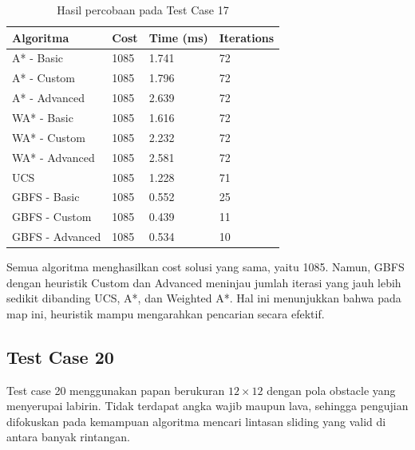 \begin{table}[H]
	\centering
	\caption{Hasil percobaan pada Test Case 17}
	\small
	\begin{tabular}{|p{4cm}|p{2.5cm}|p{2.5cm}|p{2.5cm}|}
		\hline
		\rowcolor{gray!20}
		\textbf{Algoritma} & \textbf{Cost} & \textbf{Time (ms)} & \textbf{Iterations} \\
		\hline
		A* - Basic & 1085 & 1.741 & 72 \\
		\hline
		A* - Custom & 1085 & 1.796 & 72 \\
		\hline
		A* - Advanced & 1085 & 2.639 & 72 \\
		\hline
		WA* - Basic & 1085 & 1.616 & 72 \\
		\hline
		WA* - Custom & 1085 & 2.232 & 72 \\
		\hline
		WA* - Advanced & 1085 & 2.581 & 72 \\
		\hline
		UCS & 1085 & 1.228 & 71 \\
		\hline
		GBFS - Basic & 1085 & 0.552 & 25 \\
		\hline
		GBFS - Custom & 1085 & 0.439 & 11 \\
		\hline
		GBFS - Advanced & 1085 & 0.534 & 10 \\
		\hline
	\end{tabular}
\end{table}

\begin{tcolorbox}[
	colback=green!5,
	colframe=green!50!black,
	title=\textbf{Ringkasan Test Case 17},
	arc=2mm,
	boxrule=0.8pt
]
Semua algoritma menghasilkan cost solusi yang sama, yaitu 1085. 
Namun, GBFS dengan heuristik Custom dan Advanced meninjau jumlah iterasi yang jauh lebih sedikit dibanding UCS, A*, dan Weighted A*. 
Hal ini menunjukkan bahwa pada map ini, heuristik mampu mengarahkan pencarian secara efektif.
\end{tcolorbox}


\subsection{Test Case 20}

\begin{tcolorbox}[
	colback=blue!5,
	colframe=blue!60!black,
	title=\textbf{Ringkasan Input Test Case 20},
	arc=2mm,
	boxrule=0.8pt
]
Test case 20 menggunakan papan berukuran $12 \times 12$ dengan pola obstacle yang menyerupai labirin. 
Tidak terdapat angka wajib maupun lava, sehingga pengujian difokuskan pada kemampuan algoritma mencari lintasan sliding yang valid di antara banyak rintangan.
\end{tcolorbox}

